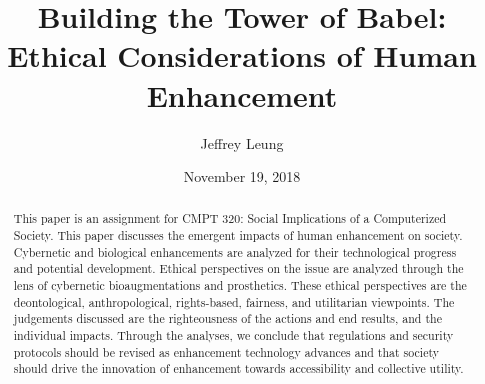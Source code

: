 \documentclass[10pt, oneside, letterpaper]{article}
\title{\textbf{Building the Tower of Babel:\\Ethical Considerations of Human Enhancement}}
\author{Jeffrey Leung}
\affil{Simon Fraser University}
\date{November 19, 2018}
\begin{document}
	\maketitle
	
	\begin{abstract}
		This paper is an assignment for CMPT 320: Social Implications of a Computerized Society. This paper discusses the emergent impacts of human enhancement on society. Cybernetic and biological enhancements are analyzed for their technological progress and potential development. Ethical perspectives on the issue are analyzed through the lens of cybernetic bioaugmentations and prosthetics. These ethical perspectives are the deontological, anthropological, rights-based, fairness, and utilitarian viewpoints. The judgements discussed are the righteousness of the actions and end results, and the individual impacts. Through the analyses, we conclude that regulations and security protocols should be revised as enhancement technology advances and that society should drive the innovation of enhancement towards accessibility and collective utility.
	\end{abstract}
	
\end{document}
